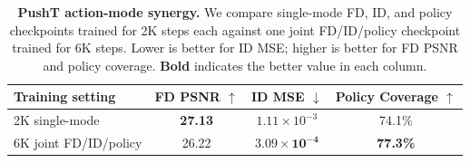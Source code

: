 \begin{table}[h]
\centering
\caption{\textbf{PushT action-mode synergy.} We compare single-mode FD, ID, and policy checkpoints trained for 2K steps each against one joint FD/ID/policy checkpoint trained for 6K steps. Lower is better for ID MSE; higher is better for FD PSNR and policy coverage. \textbf{Bold} indicates the better value in each column.}
\label{tab:pusht_fd_id_policy_open_loop}
\small
\setlength{\tabcolsep}{7pt}
\renewcommand{\arraystretch}{1.15}
\begin{tabular}{@{}lccc@{}}
\toprule
\textbf{Training setting} & \textbf{FD PSNR $\uparrow$} & \textbf{ID MSE $\downarrow$} & \textbf{Policy Coverage $\uparrow$} \\
\midrule
2K single-mode & \textbf{27.13} & $1.11 \times 10^{-3}$ & 74.1\% \\
6K joint FD/ID/policy & 26.22 & $\boldsymbol{3.09 \times 10^{-4}}$ & \textbf{77.3\%} \\
\bottomrule
\end{tabular}
\end{table}
